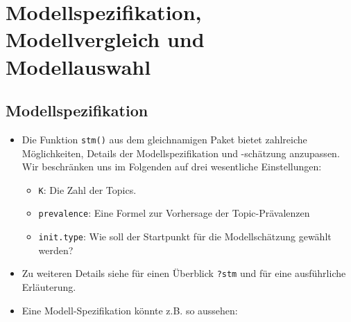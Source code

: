 \documentclass[
]{book}
\newenvironment{Shaded}{\begin{snugshade}}{\end{snugshade}}
\newcommand{\DataTypeTok}[1]{\textcolor[rgb]{0.13,0.29,0.53}{#1}}
\newcommand{\DecValTok}[1]{\textcolor[rgb]{0.00,0.00,0.81}{#1}}
\newcommand{\KeywordTok}[1]{\textcolor[rgb]{0.13,0.29,0.53}{\textbf{#1}}}
\newcommand{\NormalTok}[1]{#1}
\newcommand{\OperatorTok}[1]{\textcolor[rgb]{0.81,0.36,0.00}{\textbf{#1}}}
\newcommand{\StringTok}[1]{\textcolor[rgb]{0.31,0.60,0.02}{#1}}
\providecommand{\tightlist}{%
  \setlength{\itemsep}{0pt}\setlength{\parskip}{0pt}}
\begin{document}
\hypertarget{modellspezifikation-modellvergleich-und-modellauswahl}{%
\chapter{Modellspezifikation, Modellvergleich und Modellauswahl}\label{modellspezifikation-modellvergleich-und-modellauswahl}}

\hypertarget{modellspezifikation}{%
\section{Modellspezifikation}\label{modellspezifikation}}

\begin{itemize}
\item
  Die Funktion \texttt{stm()} aus dem gleichnamigen Paket bietet zahlreiche Möglichkeiten, Details der Modellspezifikation und -schätzung anzupassen. Wir beschränken uns im Folgenden auf drei wesentliche Einstellungen:

  \begin{itemize}
  \tightlist
  \item
    \texttt{K}: Die Zahl der Topics.
  \item
    \texttt{prevalence}: Eine Formel zur Vorhersage der Topic-Prävalenzen
  \item
    \texttt{init.type}: Wie soll der Startpunkt für die Modellschätzung gewählt werden?
  \end{itemize}
\item
  Zu weiteren Details siehe für einen Überblick \texttt{?stm} und \citet{robertsStmPackageStructural2019} für eine ausführliche Erläuterung.
\item
  Eine Modell-Spezifikation könnte z.B. so aussehen:
\end{itemize}

\begin{Shaded}
\end{Shaded}
\end{document}
